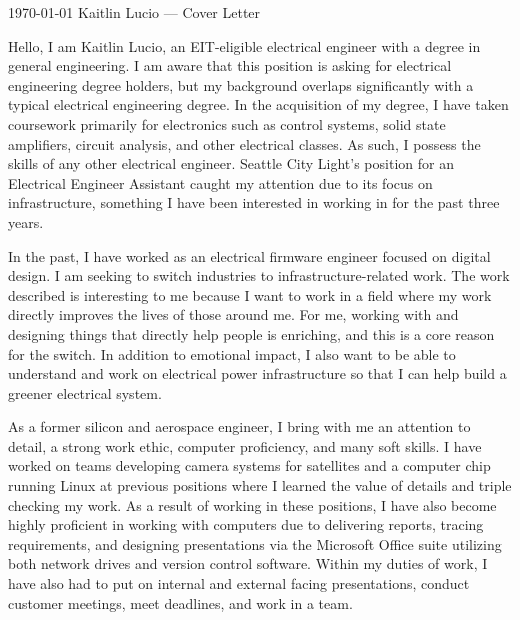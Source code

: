 \documentclass[11pt, a4paper]{awesome-cv}
\begin{document}
\makecvheader[R]

\makecvfooter
  {\today}
  {Kaitlin Lucio --- Cover Letter}
  {}

\makelettertitle

\begin{cvletter}

  \tab Hello, I am Kaitlin Lucio, an EIT-eligible electrical engineer with a degree in general engineering.
  I am aware that this position is asking for electrical engineering degree holders, but my background
  overlaps significantly with a typical electrical engineering degree.
  In the acquisition of my degree, I have taken coursework primarily for electronics such as control systems,
  solid state amplifiers, circuit analysis, and other electrical classes.
  As such, I possess the skills of any other electrical engineer.
  Seattle City Light's position for an Electrical Engineer Assistant caught my attention due to its focus on infrastructure,
  something I have been interested in working in for the past three years.
  
  \tab In the past, I have worked as an electrical firmware engineer focused on digital design.
  I am seeking to switch industries to infrastructure-related work.
  The work described is interesting to me because I want to work in a field
  where my work directly improves the lives of those around me.
  For me, working with and designing things that directly help people is enriching, and this
  is a core reason for the switch.
  In addition to emotional impact, I also want to be able to understand and work on electrical power infrastructure so that
  I can help build a greener electrical system.

  \tab As a former silicon and aerospace engineer, I bring with me an attention to detail, a strong work ethic, computer
  proficiency, and many soft skills.
  I have worked on teams developing camera systems for satellites and a computer chip running Linux at previous
  positions where I learned the value of details and triple checking my work.
  As a result of working in these positions, I have also become highly proficient in working with
  computers due to delivering reports, tracing requirements, and designing presentations via the Microsoft Office suite utilizing
  both network drives and version control software.
  Within my duties of work, I have also had to put on internal and external facing presentations,
  conduct customer meetings, meet deadlines, and work in a team.


\end{cvletter}
\end{document}
